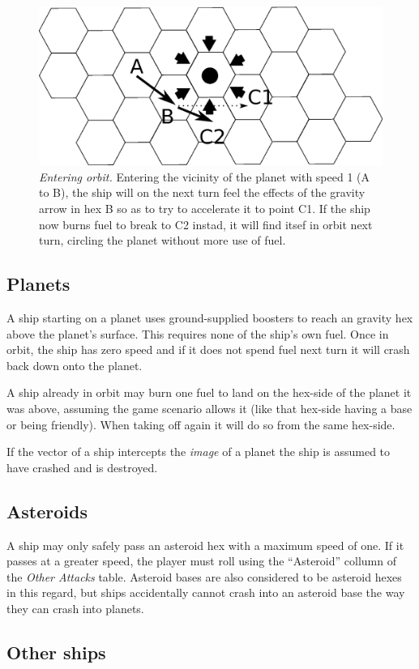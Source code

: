 \documentclass[a4paper,12pt,notitlepage,twocolumn]{article}
\begin{document}
\begin{figure}[h!]\centering  
  \includegraphics[width=0.5 \textwidth]{data/move_9.eps}  
  \caption{
\label{fig:9}\footnotesize \emph{Entering orbit.} Entering the vicinity of the
planet with speed 1 (A to B), the ship will on the next turn feel the effects of the
gravity arrow in hex B so as to try to accelerate it to point C1. If
the ship now burns fuel to break to C2 instad, it will find itsef in
orbit next turn, circling the planet without more use of fuel.} 
\end{figure}

\subsection{Planets}

A ship starting on a planet uses ground-supplied boosters to reach an
gravity hex above the planet's surface. This requires none of the ship's
own fuel. Once in orbit, the ship has zero speed and if it does not
spend fuel next turn it will crash back down onto the planet. 

A ship already in orbit may burn one fuel to land on the hex-side of the
planet it was above, assuming the game scenario allows it (like that
hex-side having a base or being friendly). When taking off again it
will do so from the same hex-side.  

If the vector of a ship intercepts the \emph{image} of a planet the ship is
assumed to have crashed and is destroyed. 

\subsection{Asteroids}

A ship may only safely pass an asteroid hex with a maximum
speed of one. If it passes at a greater speed, the player must roll
using the ``Asteroid'' collumn of the \emph{Other Attacks}
table. Asteroid bases are also considered to be asteroid hexes in
this regard, but ships accidentally cannot crash into an asteroid base
the way they can crash into planets.  


\subsection{Other ships}
\end{document}

